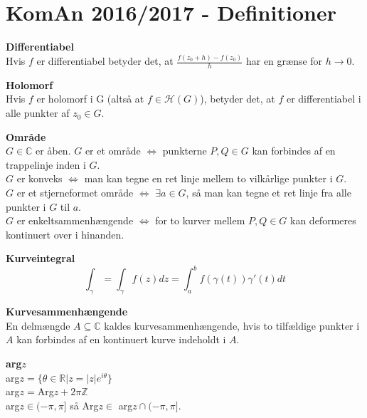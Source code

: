 \documentclass[10pt,a4paper]{article}
\theoremstyle{definition}
\begin{document}
\section{KomAn 2016/2017 - Definitioner}
\begin{framed}
\textbf{Differentiabel} \\
Hvis $f$ er differentiabel betyder det, at $\frac{f(z_0+h)-f(z_0)}{h}$ har en grænse for $h \rightarrow 0$.
\end{framed}

\begin{framed}
\textbf{Holomorf} \\
Hvis $f$ er holomorf i G (altså at $f\in \mathcal{H}(G)$), betyder det, at $f$ er differentiabel i alle punkter af $z_0 \in G$.
\end{framed}

\begin{framed}
\textbf{Område} \\
$G \in \mathbb{C}$ er åben. $G$ er et område $\Leftrightarrow$ punkterne $P, Q \in G$ kan forbindes af en trappelinje inden i $G$. \\
$G$ er konveks $\Leftrightarrow$ man kan tegne en ret linje mellem to vilkårlige punkter i $G$. \\
$G$ er et stjerneformet område $\Leftrightarrow$ $\exists a \in G$, så man kan tegne et ret linje fra alle punkter i $G$ til $a$. \\
$G$ er enkeltsammenhængende $\Leftrightarrow$ for to kurver mellem $P, Q \in G$ kan deformeres kontinuert over i hinanden.
\end{framed}

\begin{framed}
\textbf{Kurveintegral} \\
$$\int_\gamma = \int_\gamma f(z)dz = \int_a^b f(\gamma(t))\gamma'(t)dt$$
\end{framed}

\begin{framed}
\textbf{Kurvesammenhængende} \\
En delmængde $A \subseteq \mathbb{C}$ kaldes kurvesammenhængende, hvis to tilfældige punkter i $A$ kan forbindes af en kontinuert kurve indeholdt i $A$.
\end{framed}

\begin{framed}
\textbf{arg$z$} \\
arg$z = \{\theta \in \mathbb{R} | z = |z|e^{i\theta}\}$ \\
arg$z = $Arg$z + 2 \pi \mathbb{Z}$ \\
arg$z \in (-\pi, \pi]$ så Arg$z \in$  arg$z \cap (-\pi, \pi]$.
\end{framed}
\end{document}
